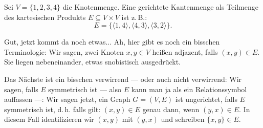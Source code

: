 \begin{math-stroke}
Sei $V = \{1, 2, 3, 4\}$ die Knotenmenge. Eine gerichtete Kantenmenge als Teilmenge des kartesischen Produkts $E \subseteq V \times V$ ist z.\,B.:
\[
E = \bigl\{ \langle 1, 4 \rangle, \langle 4, 3 \rangle, \langle 3, 2 \rangle \bigr\}.
\]

\begin{center}
\end{center}
\end{math-stroke}

\begin{spoken-clean}[00:16:00 - 00:17:26]
Gut, jetzt kommt da noch etwas... Ah, hier gibt es noch ein bisschen Terminologie: Wir sagen, zwei Knoten $x, y \in V$ heißen adjazent, falls $(x, y) \in E$. Sie liegen nebeneinander, etwas snobistisch ausgedrückt.

Das Nächste ist ein bisschen verwirrend --- oder auch nicht verwirrend: Wir sagen, falls $E$ symmetrisch ist --- also $E$ kann man ja als ein Relationssymbol auffassen ---: Wir sagen jetzt, ein Graph $G = (V, E)$ ist ungerichtet, falls $E$ symmetrisch ist, d.\,h. falls gilt: $(x, y) \in E$ genau dann, wenn $(y, x) \in E$. In diesem Fall identifizieren wir $(x, y)$ mit $(y, x)$ und schreiben $\{x, y\} \in E$.
\end{spoken-clean}

\begin{math-stroke}
\end{math-stroke}

